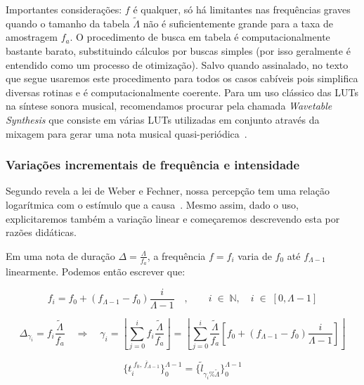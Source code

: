 Importantes considerações: $f$ é qualquer, só há limitantes nas frequências
graves quando o tamanho da tabela $\widetilde{\Lambda}$ não é suficientemente grande para a taxa de amostragem
$f_a$. O procedimento de busca em tabela
é computacionalmente bastante barato, substituindo cálculos por buscas simples (por isso geralmente
é entendido como um processo de otimização). Salvo quando assinalado,
no texto que segue usaremos este procedimento para todos os casos cabíveis pois
simplifica diversas rotinas e é computacionalmente coerente. Para um uso clássico das LUTs na síntese sonora musical, recomendamos procurar pela chamada \emph{Wavetable Synthesis} que consiste em várias LUTs utilizadas em conjunto através da mixagem para gerar uma nota musical quasi-periódica~\cite{Cook,Wavetable}.


\subsubsection{Variações incrementais de frequência e intensidade}

Segundo revela a lei de Weber e Fechner, nossa percepção tem uma relação logarítmica com
o estímulo que a causa~\cite{Weber-Fechner}. Mesmo assim, dado o uso, explicitaremos também a variação
linear e começaremos descrevendo esta por razões didáticas.

Em uma nota de duração $\Delta = \frac{\Lambda}{f_a}$, a frequência $f=f_i$ varia de $f_0$ até $f_{\Lambda -1}$
linearmente. Podemos então escrever que:

\begin{equation}\label{freqLinear}
f_i=f_0 + (f_{\Lambda-1}-f_0)\frac{i}{\Lambda-1} \quad ,\quad \quad i \;\in\; \mathbb{N}, \quad i \;\in\; [0,\Lambda-1]
\end{equation}

\begin{equation}\label{indiceLinear}
\Delta_{\gamma_i}=f_i\frac{\widetilde{\Lambda}}{f_a} \quad \Rightarrow \quad \gamma_i=\left \lfloor \sum_{j=0}^{i} f_i\frac{\widetilde{\Lambda}}{f_a} \right \rfloor   =\left \lfloor \sum_{j=0}^{i}  \frac{\widetilde{\Lambda}}{f_a} \left [f_0 + (f_{\Lambda-1}-f_0)\frac{i}{\Lambda-1} \right ] \right \rfloor 
\end{equation}

\begin{equation}\label{serieAmostralLin}
\{t_i^{\;\overline{f_0,\, f_{\Lambda-1}}}\}_0^{\Lambda-1}=\{\widetilde{l}_{\gamma_i \% \widetilde{\Lambda}}\}_0^{\Lambda-1}
\end{equation}

